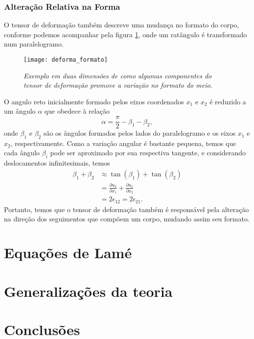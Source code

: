 \subsubsection{Altera\c{c}\~ao Relativa na Forma}

O tensor de deforma\c{c}\~ao tamb\'em descreve uma mudan\c{c}a no formato do corpo, conforme podemos acompanhar pela figura \ref{fig.deforma_formato}, onde um rat\^angulo \'e transformado num paralelogramo. 
\begin{figure}
\centering
\texttt{[image: deforma\_formato]}
\caption{\textit{Exemplo em duas dimens\~oes de como algumas componentes do tensor de deforma\c{c}\~ao promove a varia\c{c}\~ao no formato do meio.}}
\label{fig.deforma_formato}
\end{figure}
O angulo reto inicialmente formado pelos eixos coordenados $x_1$ e $x_2$ \'e reduzido a um \^angulo $\alpha$ que obedece \`a rela\c{c}\~ao
\begin{equation}
\alpha=\frac{\pi}{2}-\beta_1-\beta_2,
\end{equation}
onde $\beta_1$ e $\beta_2$ s\~ao os \^angulos formados pelos lados do paralelogramo e os eixos $x_1$ e $x_2$, respectivamente. Como a varia\c{c}\~ao angular \'e bastante pequena, temos que cada \^angulo $\beta_i$ pode ser aproximado por sua respectiva tangente, e considerando deslocamentos infinitesimais, temos
\begin{align*}
\beta_1+\beta_2&\approx\tan(\beta_1)+\tan(\beta_2)\\
&=\frac{\partial u_2}{\partial x_1}+\frac{\partial u_1}{\partial x_2}\\
&=2\epsilon_{12}=2\epsilon_{21}.
\end{align*}
Portanto, temos que o tensor de deforma\c{c}\~ao tamb\'em \'e respons\'avel pela altera\c{c}\~ao na dire\c{c}\~ao dos seguimentos que comp\~oem um corpo, mudando assim seu formato.

\section{Equações de Lamé}

\section{Generalizações da teoria}

\section{Conclusões}